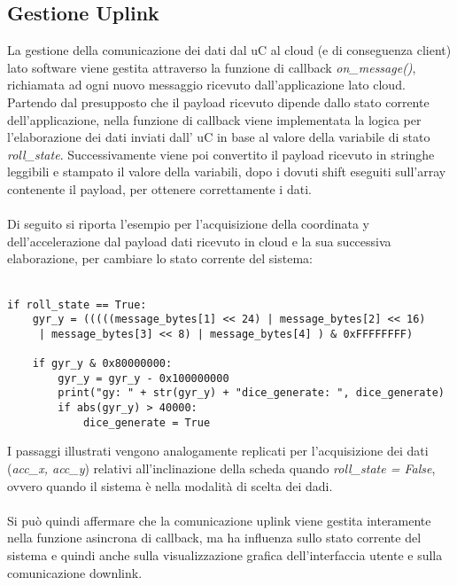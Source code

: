 \subsection{Gestione Uplink}
La gestione della comunicazione dei dati dal uC al cloud (e di conseguenza client) lato software viene gestita attraverso la funzione di callback 
\textit{on\_message()}, richiamata ad ogni nuovo messaggio ricevuto dall'applicazione lato cloud. Partendo dal presupposto che il payload ricevuto
dipende dallo stato corrente dell'applicazione, nella funzione di callback viene implementata la logica per l'elaborazione dei dati inviati dall' uC in base al valore
della variabile di stato \textit{roll\_state}. Successivamente viene poi convertito il payload ricevuto in stringhe leggibili e stampato il valore della variabili, 
dopo i dovuti shift eseguiti sull'array contenente il payload, per ottenere correttamente i dati.
\\\\Di seguito si riporta l'esempio per l'acquisizione della coordinata y dell'accelerazione dal payload dati ricevuto in cloud e la sua 
successiva elaborazione, per cambiare lo stato corrente del sistema:\\\\
\begin{verbatim}
if roll_state == True:
    gyr_y = (((((message_bytes[1] << 24) | message_bytes[2] << 16)
     | message_bytes[3] << 8) | message_bytes[4] ) & 0xFFFFFFFF)  

    if gyr_y & 0x80000000:
        gyr_y = gyr_y - 0x100000000
        print("gy: " + str(gyr_y) + "dice_generate: ", dice_generate)
        if abs(gyr_y) > 40000:
            dice_generate = True
\end{verbatim}
I passaggi illustrati vengono analogamente replicati per l'acquisizione dei dati (\textit{acc\_x, acc\_y}) relativi all'inclinazione della scheda
quando \textit{roll\_state = False}, ovvero quando il sistema è nella modalità di scelta dei dadi.
\\\\Si può quindi affermare che la comunicazione uplink viene gestita interamente nella funzione asincrona di callback, ma ha influenza 
sullo stato corrente del sistema e quindi anche sulla visualizzazione grafica dell'interfaccia utente e sulla comunicazione downlink.

